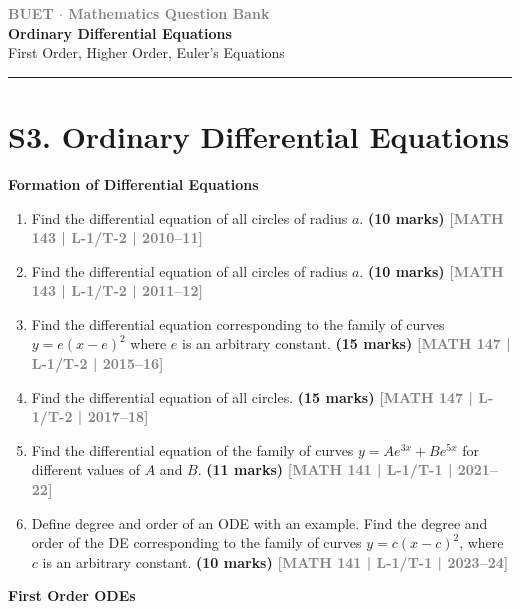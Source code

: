 \documentclass[12pt,a4paper]{article}
\newcommand{\yr}[1]{\hfill\textcolor{gray}{\small\textbf{[#1]}}}
\newcommand{\mk}[1]{\textcolor{orange!70!black}{\small\textbf{(#1 marks)}}}
\newcommand{\subtopic}[2]{%
  \vspace{10pt}
  \noindent\begin{tcolorbox}[colback=#1!8,colframe=#1,boxrule=0.6pt,arc=4pt,
    left=6pt,right=6pt,top=4pt,bottom=4pt]
    \small\bfseries\textcolor{#1}{#2}
  \end{tcolorbox}
  \vspace{2pt}
}
\newcommand{\secdivider}[3]{%
  \newpage\thispagestyle{empty}%
  \vspace*{\fill}%
  \begin{tcolorbox}[enhanced,colback=#3!6,colframe=#3,boxrule=1.5pt,arc=8pt,
    left=20pt,right=20pt,top=22pt,bottom=22pt,
    shadow={3pt}{-3pt}{0pt}{black!15}]
    \centering
    {\large\textcolor{gray}{\textbf{BUET $\cdot$ Mathematics Question Bank}}}\\[8pt]
    {\fontsize{26}{32}\selectfont\bfseries\textcolor{#3}{#1}}\\[6pt]
    {\fontsize{15}{19}\selectfont\textcolor{dgray}{#2}}\\[12pt]
    \textcolor{#3!60}{\rule{0.5\textwidth}{0.5pt}}
  \end{tcolorbox}%
  \vspace*{\fill}\newpage%
}
\begin{document}
\secdivider{Ordinary Differential Equations}{First Order, Higher Order, Euler's Equations}{cC}

\section{S3. Ordinary Differential Equations}
\label{sec:S3}

\subtopic{cC}{Formation of Differential Equations}
\label{sub:s3-formation}

\begin{enumerate}

\item Find the differential equation of all circles of radius $a$.
\mk{10} \yr{MATH 143 | L-1/T-2 | 2010--11}

\item Find the differential equation of all circles of radius $a$.
\mk{10\textonehalf} \yr{MATH 143 | L-1/T-2 | 2011--12}

\item Find the differential equation corresponding to the family of curves $y=e(x-e)^{2}$ where $e$ is an arbitrary constant.
\mk{15} \yr{MATH 147 | L-1/T-2 | 2015--16}

\item Find the differential equation of all circles.
\mk{15} \yr{MATH 147 | L-1/T-2 | 2017--18}

\item Find the differential equation of the family of curves $y=Ae^{3x}+Be^{5x}$ for different values of $A$ and $B$.
\mk{11} \yr{MATH 141 | L-1/T-1 | 2021--22}

\item Define degree and order of an ODE with an example. Find the degree and order of the DE corresponding to the family of curves $y=c(x-c)^{2}$, where $c$ is an arbitrary constant.
\mk{10} \yr{MATH 141 | L-1/T-1 | 2023--24}

\end{enumerate}

\subtopic{cC}{First Order ODEs}
\label{sub:s3-first}
\end{document}
